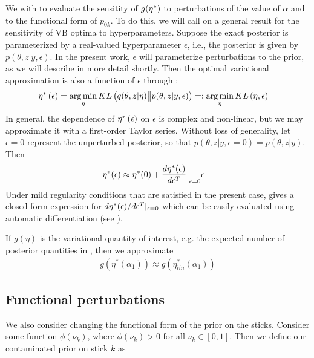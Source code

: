 We with to evaluate the sensitity of $g(\eta^{*})$ to perturbations of the value
of $\alpha$ and to the functional form of $p_{0k}$.  To do this, we will call on
a general result for the sensitivity of VB optima to hyperparameters.  Suppose
the exact posterior is parameterized by a real-valued hyperparameter $\epsilon$,
i.e., the posterior is given by $p\left(\theta, z \vert y, \epsilon\right)$. In
the present work, $\epsilon$ will parameterize perturbations to the prior, as we
will describe in more detail shortly.  Then the optimal variational
approximation is also a function of $\epsilon$ through
:
%
\begin{align}
    \eta^{*}\left(\epsilon\right) &=
    \operatorname*{arg\,min}_{\eta} KL\left(
        q(\theta, z \vert \eta) \big\| p(\theta, z | y, \epsilon) \right) =:
    \operatorname*{arg\,min}_{\eta} KL\left(\eta, \epsilon\right) \label{eq:pert_kl_objective}
\end{align}
%
In general, the dependence of $\eta^{*}\left(\epsilon\right)$ on $\epsilon$ is
complex and non-linear, but we may approximate it with a first-order Taylor
series. Without loss of generality, let $\epsilon=0$ represent the unperturbed
posterior, so that $p\left(\theta, z \vert y, \epsilon=0\right) = p\left(\theta,
z \vert y \right)$.  Then
%
\begin{align}
\eta^{*}(\epsilon) &\approx
 \eta^{*}(0) +
    \frac{d \eta^{*}(\epsilon)}{d\epsilon^T}\Big|_{\epsilon=0}
    \epsilon \label{eq:our_approximation}
\end{align}
%
Under mild regularity conditions that are satisfied in the present case,
\citet[Theorem 2]{giordano:2017:covariances} gives a closed form
expression for $d \eta^{*}(\epsilon)/ d\epsilon^T \vert_{\epsilon = 0}$
which can be easily evaluated using automatic differentiation
\citep{maclaurin:2015:autograd} (see ).

If $g(\eta)$ is the variational quantity of interest, e.g. the expected number
of posterior quantities in , then we
approximate
%
\begin{align}
    g(\eta^*(\alpha_1)) \approx g(\eta^*_{lin}(\alpha_1))
\end{align}

\subsection{Functional perturbations}
\label{sec:func_pert}
%
We also consider changing the functional form of the prior on the sticks.
Consider some function $\phi(\nu_k)$, where $\phi(\nu_k) > 0$ for all $\nu_k \in
[0, 1]$. Then we define our contaminated prior on stick $k$ as

